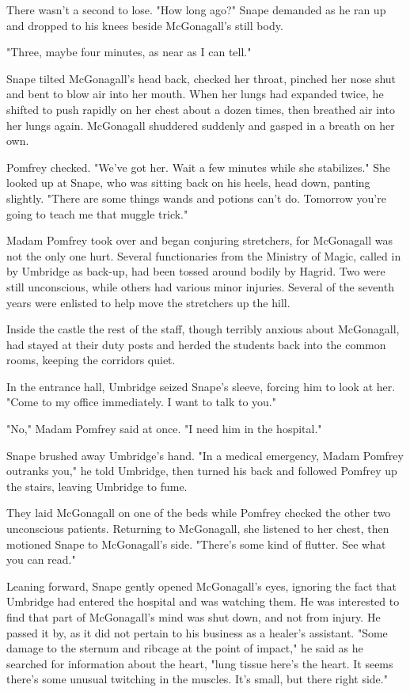 There wasn't a second to lose. "How long ago?" Snape demanded as he ran up and dropped to his knees beside McGonagall's still body.

"Three, maybe four minutes, as near as I can tell."

Snape tilted McGonagall's head back, checked her throat, pinched her nose shut and bent to blow air into her mouth. When her lungs had expanded twice, he shifted to push rapidly on her chest about a dozen times, then breathed air into her lungs again. McGonagall shuddered suddenly and gasped in a breath on her own.

Pomfrey checked. "We've got her. Wait a few minutes while she stabilizes." She looked up at Snape, who was sitting back on his heels, head down, panting slightly. "There are some things wands and potions can't do. Tomorrow you're going to teach me that muggle trick."

Madam Pomfrey took over and began conjuring stretchers, for McGonagall was not the only one hurt. Several functionaries from the Ministry of Magic, called in by Umbridge as back-up, had been tossed around bodily by Hagrid. Two were still unconscious, while others had various minor injuries. Several of the seventh years were enlisted to help move the stretchers up the hill.

Inside the castle the rest of the staff, though terribly anxious about McGonagall, had stayed at their duty posts and herded the students back into the common rooms, keeping the corridors quiet.

In the entrance hall, Umbridge seized Snape's sleeve, forcing him to look at her. "Come to my office immediately. I want to talk to you."

"No," Madam Pomfrey said at once. "I need him in the hospital."

Snape brushed away Umbridge's hand. "In a medical emergency, Madam Pomfrey outranks you," he told Umbridge, then turned his back and followed Pomfrey up the stairs, leaving Umbridge to fume.

They laid McGonagall on one of the beds while Pomfrey checked the other two unconscious patients. Returning to McGonagall, she listened to her chest, then motioned Snape to McGonagall's side. "There's some kind of flutter. See what you can read."

Leaning forward, Snape gently opened McGonagall's eyes, ignoring the fact that Umbridge had entered the hospital and was watching them. He was interested to find that part of McGonagall's mind was shut down, and not from injury. He passed it by, as it did not pertain to his business as a healer's assistant. "Some damage to the sternum and ribcage at the point of impact," he said as he searched for information about the heart, "lung tissue{\el} here's the heart. It seems{\el} there's some unusual twitching in the muscles. It's small, but there{\el} right side."

